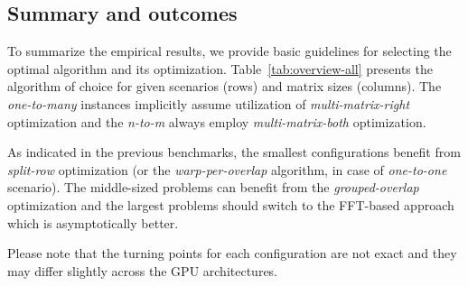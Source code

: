 \subsection{Summary and outcomes}

To summarize the empirical results, we provide basic guidelines for selecting the optimal algorithm and its optimization. Table~\ref{tab:overview-all} presents the algorithm of choice for given scenarios (rows) and matrix sizes (columns). The \emph{one-to-many} instances implicitly assume utilization of \emph{multi-matrix-right} optimization and the \emph{n-to-m} always employ \emph{multi-matrix-both} optimization.

As indicated in the previous benchmarks, the smallest configurations benefit from \emph{split-row} optimization (or the \emph{warp-per-overlap} algorithm, in case of \emph{one-to-one} scenario). The middle-sized problems can benefit from the \emph{grouped-overlap} optimization and the largest problems should switch to the FFT-based approach which is asymptotically better.

Please note that the turning points for each configuration are not exact and they may differ slightly across the GPU architectures.

